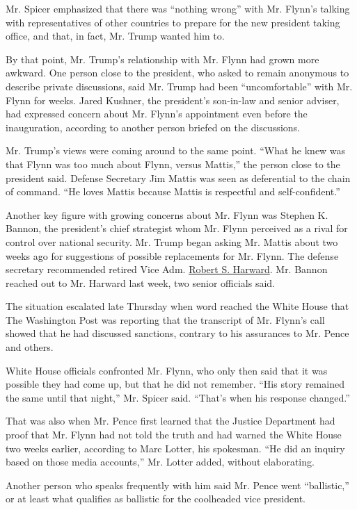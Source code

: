 Mr. Spicer emphasized that there was ``nothing wrong'' with Mr. Flynn's
talking with representatives of other countries to prepare for the new
president taking office, and that, in fact, Mr. Trump wanted him to.

By that point, Mr. Trump's relationship with Mr. Flynn had grown more
awkward. One person close to the president, who asked to remain
anonymous to describe private discussions, said Mr. Trump had been
``uncomfortable'' with Mr. Flynn for weeks. Jared Kushner, the
president's son-in-law and senior adviser, had expressed concern about
Mr. Flynn's appointment even before the inauguration, according to
another person briefed on the discussions.

Mr. Trump's views were coming around to the same point. ``What he knew
was that Flynn was too much about Flynn, versus Mattis,'' the person
close to the president said. Defense Secretary Jim Mattis was seen as
deferential to the chain of command. ``He loves Mattis because Mattis is
respectful and self-confident.''

Another key figure with growing concerns about Mr. Flynn was Stephen K.
Bannon, the president's chief strategist whom Mr. Flynn perceived as a
rival for control over national security. Mr. Trump began asking Mr.
Mattis about two weeks ago for suggestions of possible replacements for
Mr. Flynn. The defense secretary recommended retired Vice Adm.
\href{https://www.nytimes.com/2017/02/14/us/politics/robert-harward-national-security-adviser.html}{Robert
S. Harward}. Mr. Bannon reached out to Mr. Harward last week, two senior
officials said.

The situation escalated late Thursday when word reached the White House
that The Washington Post was reporting that the transcript of Mr.
Flynn's call showed that he had discussed sanctions, contrary to his
assurances to Mr. Pence and others.

White House officials confronted Mr. Flynn, who only then said that it
was possible they had come up, but that he did not remember. ``His story
remained the same until that night,'' Mr. Spicer said. ``That's when his
response changed.''

That was also when Mr. Pence first learned that the Justice Department
had proof that Mr. Flynn had not told the truth and had warned the White
House two weeks earlier, according to Marc Lotter, his spokesman. ``He
did an inquiry based on those media accounts,'' Mr. Lotter added,
without elaborating.

Another person who speaks frequently with him said Mr. Pence went
``ballistic,'' or at least what qualifies as ballistic for the
coolheaded vice president.


